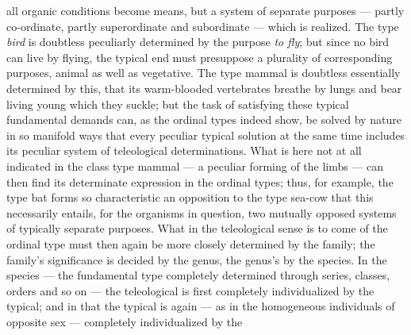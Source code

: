 \documentclass[12pt,a4paper]{book}
\begin{document}
\setcounter{footnote}{0}
all organic conditions become means, but a system of separate purposes --- partly
co-ordinate, partly superordinate and subordinate --- which is realized. The type
\emph{bird} is doubtless peculiarly determined by the purpose \emph{to fly}; but since
no bird can live by flying, the typical end must presuppose a plurality of
corresponding purposes, animal as well as vegetative. The type mammal is doubtless
essentially determined by this, that its warm-blooded vertebrates breathe by lungs and
bear living young which they suckle; but the task of satisfying these typical
fundamental demands can, as the ordinal types indeed show, be solved by nature in so
manifold ways that every peculiar typical solution at the same time includes its
peculiar system of teleological determinations. What is here not at all indicated in
the class type mammal --- a peculiar forming of the limbs --- can then find its
determinate expression in the ordinal types; thus, for example, the type bat forms so
characteristic an opposition to the type sea-cow that this necessarily entails, for the
organisms in question, two mutually opposed systems of typically separate purposes.
What in the teleological sense is to come of the ordinal type must then again be more
closely determined by the family; the family's significance is decided by the genus,
the genus's by the species. In the species --- the fundamental type completely
determined through series, classes, orders and so on --- the teleological is first
completely individualized by the typical; and in that the typical is again ---
as in the homogeneous individuals of opposite sex --- completely individualized by the
\end{document}
